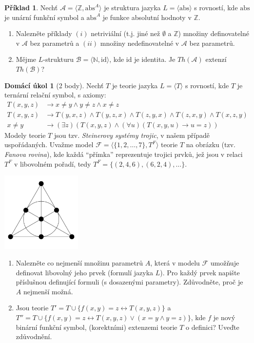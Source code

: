 \documentclass[a4paper]{article}
\theoremstyle{definition}
\newtheorem{problem}{Příklad}
\newtheorem*{ukol}{Domácí úkol}
\begin{document}
\medskip\begin{problem} %
Nechť $\mathcal{A}=\langle\mathbb{Z},\mathrm{abs}^A \rangle$ je struktura jazyka $L=\langle \mathrm{abs} \rangle$ s rovností, kde $\mathrm{abs}$ je unární funkční symbol a $\mathrm{abs}^A$ je funkce absolutní hodnoty v $\mathbb{Z}$.
\begin{enumerate}
    \item Nalezněte příklady $(i)$ netriviální (t.j. jiné než $\emptyset$ a $\mathbb{Z}$) množiny definovatelné v $\mathcal{A}$ bez parametrů a $(ii)$ množiny nedefinovatelné v $\mathcal{A}$ bez parametrů.
    \item Mějme $L$-strukturu $\mathcal{B}=\langle\mathbb{N},\mathrm{id} \rangle$, kde $\mathrm{id}$ je identita. Je $Th(\mathcal{A})$ extenzí $Th(\mathcal{B})$?
\end{enumerate}
\end{problem}


\medskip\begin{ukol}[2 body]
    Nechť $T$ je teorie jazyka $L=\langle T \rangle$ s rovností, kde $T$ je ternární relační symbol, s axiomy:
    \begin{align*}
        T(x,y,z)&\to x\ne y \wedge y\ne z \wedge x\ne z \\
        T(x,y,z)&\to T(y,x,z)\wedge T(y,z,x)\wedge T(z,y,x)\wedge T(z,x,y)\wedge T(x,z,y)\\
        x\ne y &\to (\exists z)(T(x,y,z)\wedge(\forall u)(T(x,y,u)\to u=z))
    \end{align*}
    Modely teorie $T$ jsou tzv. \emph{Steinerovy systémy trojic}, v našem případě uspořádaných. Uvažme model $\mathcal{F}=\langle \{1,2,\dots,7\},T^F\rangle$ teorie $T$ na obrázku (tzv. \emph{Fanova rovina}), kde každá ``přímka'' reprezentuje trojici prvků, jež jsou v relaci $T^F$ v libovolném pořadí, tedy $T^F=\{(2,4,6),(6,2,4),\dots\}$.
    \begin{center}
        \includegraphics[height=4cm]{files/fano.png}  
    \end{center}
    \begin{enumerate}        
        \item Nalezněte co nejmenší množinu parametrů $A$, která v modelu $\mathcal{F}$ umožňuje definovat libovolný jeho prvek (formulí jazyka $L$). Pro každý prvek napište příslušnou definující formuli (s dosazenými parametry). Zdůvodněte, proč je $A$ nejmenší možná.
        \item Jsou teorie $T'=T \cup \{f(x,y)=z \leftrightarrow T(x,y,z)\}$ a $T''=T\cup \{f(x,y)=z \leftrightarrow T(x,y,z) \vee (x=y \wedge y=z)\}$, kde $f$ je nový binární funkční symbol, (korektními) extenzemi teorie $T$ o definici? Uveďte zdůvodnění.
    \end{enumerate} 
\end{ukol}
\end{document}
